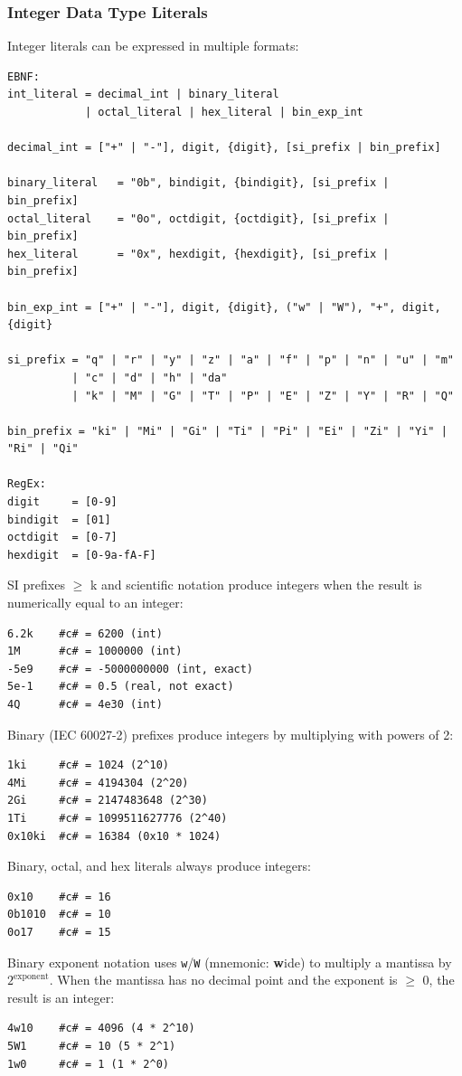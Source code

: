 \subsubsection{Integer Data Type Literals}
Integer literals can be expressed in multiple formats:
\begin{verbatim}
EBNF:
int_literal = decimal_int | binary_literal 
            | octal_literal | hex_literal | bin_exp_int

decimal_int = ["+" | "-"], digit, {digit}, [si_prefix | bin_prefix]

binary_literal   = "0b", bindigit, {bindigit}, [si_prefix | bin_prefix]
octal_literal    = "0o", octdigit, {octdigit}, [si_prefix | bin_prefix]
hex_literal      = "0x", hexdigit, {hexdigit}, [si_prefix | bin_prefix]

bin_exp_int = ["+" | "-"], digit, {digit}, ("w" | "W"), "+", digit, {digit}

si_prefix = "q" | "r" | "y" | "z" | "a" | "f" | "p" | "n" | "u" | "m"
          | "c" | "d" | "h" | "da"
          | "k" | "M" | "G" | "T" | "P" | "E" | "Z" | "Y" | "R" | "Q"

bin_prefix = "ki" | "Mi" | "Gi" | "Ti" | "Pi" | "Ei" | "Zi" | "Yi" | "Ri" | "Qi"

RegEx:
digit     = [0-9]
bindigit  = [01]
octdigit  = [0-7]
hexdigit  = [0-9a-fA-F]
\end{verbatim}

SI prefixes $\geq$ k and scientific notation produce integers when the result is numerically equal to an integer:
\begin{verbatim}
6.2k    #c# = 6200 (int)
1M      #c# = 1000000 (int)
-5e9    #c# = -5000000000 (int, exact)
5e-1    #c# = 0.5 (real, not exact)
4Q      #c# = 4e30 (int)
\end{verbatim}

Binary (IEC 60027-2) prefixes produce integers by multiplying with powers of 2:
\begin{verbatim}
1ki     #c# = 1024 (2^10)
4Mi     #c# = 4194304 (2^20)
2Gi     #c# = 2147483648 (2^30)
1Ti     #c# = 1099511627776 (2^40)
0x10ki  #c# = 16384 (0x10 * 1024)
\end{verbatim}

Binary, octal, and hex literals always produce integers:
\begin{verbatim}
0x10    #c# = 16
0b1010  #c# = 10
0o17    #c# = 15
\end{verbatim}

Binary exponent notation uses \texttt{w}/\texttt{W} (mnemonic: \textbf{w}ide) to multiply a mantissa by $2^{\text{exponent}}$. When the mantissa has no decimal point and the exponent is $\geq$ 0, the result is an integer:
\begin{verbatim}
4w10    #c# = 4096 (4 * 2^10)
5W1     #c# = 10 (5 * 2^1)
1w0     #c# = 1 (1 * 2^0)
\end{verbatim}

